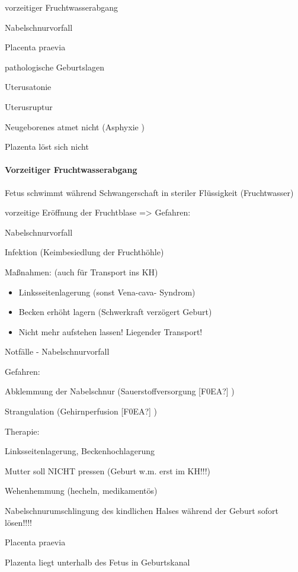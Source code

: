 \documentclass{article}
\begin{document}
vorzeitiger Fruchtwasserabgang

Nabelschnurvorfall

Placenta praevia

pathologische Geburtslagen

Uterusatonie

Uterusruptur

Neugeborenes atmet nicht (Asphyxie )

Plazenta l\"ost sich nicht

\paragraph[Vorzeitiger \ Fruchtwasserabgang]{Vorzeitiger 
Fruchtwasserabgang}
Fetus schwimmt w\"ahrend  Schwangerschaft in steriler Fl\"ussigkeit 
(Fruchtwasser)

vorzeitige Er\"offnung der Fruchtblase ={\textgreater}  Gefahren:

Nabelschnurvorfall

Infektion (Keimbesiedlung der Fruchth\"ohle)

Ma{\ss}nahmen: (auch f\"ur Transport ins KH)

\begin{itemize}
\item Linksseitenlagerung (sonst Vena-cava- Syndrom)

\item Becken erh\"oht lagern (Schwerkraft verz\"ogert  Geburt)

\item Nicht mehr aufstehen lassen! Liegender Transport!

\end{itemize}
Notf\"alle - Nabelschnurvorfall

Gefahren:

Abklemmung der Nabelschnur  (Sauerstoffversorgung  [F0EA?] )

Strangulation (Gehirnperfusion [F0EA?] )

Therapie:

Linksseitenlagerung, Beckenhochlagerung

Mutter soll NICHT pressen (Geburt w.m. erst  im KH!!!)

Wehenhemmung (hecheln, medikament\"os) 

Nabelschnurumschlingung des  kindlichen Halses w\"ahrend der Geburt 
sofort l\"osen!!!!

Placenta praevia

Plazenta liegt unterhalb des Fetus in  Geburtskanal
\end{document}
